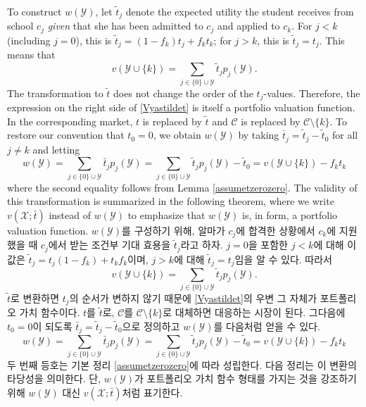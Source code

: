 \documentclass[11pt]{article} %
\theoremstyle{definition}
\theoremstyle{definition}
\begin{document}
\ifen
To construct $w(\mathcal{Y})$, let $\tilde t_j$ denote the expected utility the student receives from school $c_j$ \emph{given} that she has been admitted to $c_j$ and applied to $c_k$. For $j < k$ (including $j = 0$), this is $\tilde t_j = (1- f_k) t_j + f_k t_k$; for $j > k $, this is $\tilde t_j = t_j$. This means that 
\begin{equation}\label{Vyastildet}
v(\mathcal{Y}\cup\{k\}) = \sum_{j \in \{0\} \cup \mathcal{Y}} \tilde t_j p_j(\mathcal{Y}).\end{equation}
The transformation to $\tilde t$ does not change the order of the $t_j$-values. Therefore, the expression on the right side of \eqref{Vyastildet} is itself a portfolio valuation function. In the corresponding market, $t$ is replaced by $\tilde t$ and $\mathcal{C}$ is replaced by $\mathcal{C}\setminus\{k\}$. To restore our convention that $t_0 = 0$, we obtain $w(\mathcal{Y})$ by taking $\bar t_j = \tilde t_j - \tilde t_0$ for all $j \neq k$ and letting
\begin{equation}  \label{wYvXminusconst}
w(\mathcal{Y})
= \sum_{j \in \{0\} \cup \mathcal{Y}} \bar t_j p_j(\mathcal{Y})
= \sum_{j \in \{0\} \cup \mathcal{Y}} \tilde t_j p_j(\mathcal{Y})- \tilde t_0
= v(\mathcal{Y}\cup\{k\}) -  f_k t_k \end{equation}
where the second equality follows from Lemma \ref{assumetzerozero}. The validity of this transformation is summarized in the following theorem, where we write $v(\mathcal{X}; \bar t)$ instead of $w(\mathcal{Y})$ to emphasize that $w(\mathcal{Y})$ is, in form, a portfolio valuation function. 
\else
$w(\mathcal{Y})$를 구성하기 위해, 알마가 $c_j$에 합격한 상황에서 $c_k$에 지원했을 때 $c_j$에서 받는 조건부 기대 효용을 $\tilde t_j$라고 하자. $j = 0$을 포함한 $j < k$에 대해 이값은 $\tilde t_j = t_j (1- f_k) + t_k f_k$이며, $j > k $에 대해 $\tilde t_j = t_j$임을 알 수 있다. 따라서 
\begin{equation}\label{Vyastildet}
v(\mathcal{Y}\cup\{k\}) = \sum_{j \in \{0\} \cup \mathcal{Y}} \tilde t_j p_j(\mathcal{Y}).\end{equation}
$\tilde t$로 변환하면 $t_j$의 순서가 변하지 않기 때문에 \eqref{Vyastildet}의 우변 그 자체가 포트폴리오 가치 함수이다. $t$를 $\tilde t$로, $\mathcal{C}$를 $\mathcal{C}\setminus \{k\}$로 대체하면 대응하는 시장이 된다. 그다음에 $t_0 = 0$이 되도록 $\bar t_j = \tilde t_j - \tilde t_0$으로 정의하고 $w(\mathcal{Y})$를 다음처럼 얻을 수 있다. 
\begin{equation}  \label{wYvXminusconst}
w(\mathcal{Y})
= \sum_{j \in \{0\} \cup \mathcal{Y}} \bar t_j p_j(\mathcal{Y})
= \sum_{j \in \{0\} \cup \mathcal{Y}} \tilde t_j p_j(\mathcal{Y})- \tilde t_0
= v(\mathcal{Y}\cup\{k\}) -  f_k t_k \end{equation}
두 번째 등호는 기본 정리 \ref{assumetzerozero}에 따라 성립한다. 다음 정리는 이 변환의 타당성을 의미한다. 단, $w(\mathcal{Y})$가 포트폴리오 가치 함수 형태를 가지는 것을 강조하기 위해 $w(\mathcal{Y})$ 대신 $v(\mathcal{X}; \bar t)$처럼 표기한다.
\fi
\end{document}
